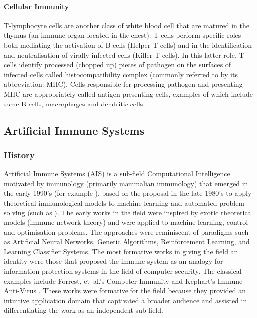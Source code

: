 \paragraph{Cellular Immunity} T-lymphocyte cells are another class of white blood cell that are matured in the thymus (an immune organ located in the chest). T-cells perform specific roles both mediating the activation of B-cells (Helper T-cells) and in the identification and neutralisation of virally infected cells (Killer T-cells). In this latter role, T-cells identify processed (chopped up) pieces of pathogen on the surfaces of infected cells called histocompatibility complex (commonly referred to by its abbreviation: MHC). Cells responsible for processing pathogen and presenting MHC are appropriately called antigen-presenting cells, examples of which include some B-cells, macrophages and dendritic cells.

%
%
\subsection{Artificial Immune Systems}
\label{sec:ais}

%
%
\subsubsection{History}
Artificial Immune Systems (AIS) is a sub-field Computational Intelligence motivated by immunology (primarily mammalian immunology) that emerged in the early 1990's (for example \cite{Bersini1990, Ishida1990}), based on the proposal in the late 1980's to apply  theoretical immunological models to machine learning and automated problem solving (such as \cite{Hoffmann1986, Farmer1986a}). The early works in the field were inspired by exotic theoretical models (immune network theory) and were applied to machine learning, control and optimisation problems. The approaches were reminiscent of paradigms such as Artificial Neural Networks, Genetic Algorithms, Reinforcement Learning, and Learning Classifier Systems. The most formative works in giving the field an identity were those that proposed the immune system as an analogy for information protection systems in the field of computer security. The classical examples include Forrest, et~al.'s Computer Immunity \cite{Forrest1994a, Forrest1997a} and Kephart's Immune Anti-Virus \cite{Kephart1994, Kephart1995}. These works were formative for the field because they provided an intuitive application domain that captivated a broader audience and assisted in differentiating the work as an independent sub-field.

